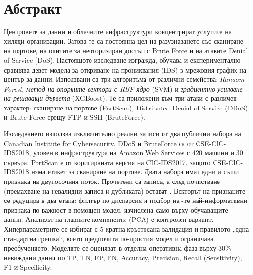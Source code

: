 \chapter*{Абстракт}
\thispagestyle{plain}

Центровете за данни и облачните инфраструктури концентрират услугите на хиляди организации. Затова те са постоянна цел на разузнаването със сканиране на портове, на опитите за неоторизиран достъп с Brute Force и на атаките Denial of Service (DoS). Настоящото изследване изгражда, обучава и експериментално сравнява девет модела за откриване на прониквания (IDS) в мрежовия трафик на център за данни. Използвани са три алгоритъма от различни семейства: \emph{Random Forest}, \emph{метод на опорните вектори с RBF ядро} (SVM) и \emph{градиентно усилване на решаващи дървета} (XGBoost). Те са приложени към три атаки с различен характер: сканиране на портове (PortScan), Distributed Denial of Service (DDoS) и Brute Force срещу FTP и SSH (BruteForce).

Изследването използва изключително реални записи от два публични набора на Canadian Institute for Cybersecurity. DDoS и BruteForce са от CSE-CIC-IDS2018, уловен в инфраструктура на Amazon Web Services с 420 машини и 30 сървъра. PortScan е от коригираната версия на CIC-IDS2017, защото CSE-CIC-IDS2018 няма етикет за сканиране на портове. Двата набора имат едни и същи  признака на двупосочния поток. Прочетени са  записа, а след почистване (премахване на  невалидни записа и  дубликата) остават . Векторът на признаците се редуцира в два етапа: филтър по дисперсия и подбор на -те най-информативни признака по важност в помощен модел, изчислена само върху обучаващите данни. Анализът на главните компоненти (PCA) е контролен вариант. Хиперпараметрите се избират с 5-кратна кръстосана валидация и правилото „една стандартна грешка“, което предпочита по-простия модел и ограничава преобучението. Моделите се оценяват в отделна оперативна фаза върху 30\% невиждани данни по TP, TN, FP, FN, Accuracy, Precision, Recall (Sensitivity), F1 и Specificity.

